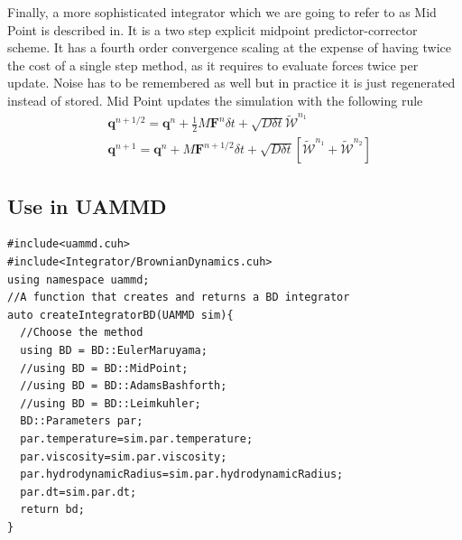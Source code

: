 \documentclass[ twoside,openright,titlepage,numbers=noenddot,%
headinclude,footinclude,cleardoublepage=empty,abstract=on,
BCOR=5mm,paper=a4,fontsize=11pt, dvipsnames
]{scrreprt}
\def\ucpp{uammd_cpp_lexer.py:UAMMDCppLexer -x}
\renewcommand{\vec}[1]{\bm{#1}}
\newcommand{\dt}{\delta t}
\newcommand{\half}{\frac{1}{2}}
\newcommand{\noise}{\widetilde{W}}
\newcommand{\ppos}{q}
\begin{document}
Finally, a more sophisticated integrator which we are going to refer to as Mid Point is described in\cite{Delong2013}. 
It is a two step explicit midpoint predictor-corrector scheme. It has a fourth order convergence scaling at the expense of having twice the cost of a single step method, as it requires to evaluate forces twice per update. Noise has to be remembered as well but in practice it is just regenerated instead of stored.
Mid Point updates the simulation with the following rule
\begin{equation}
  \begin{aligned}
    &\vec{\ppos}^{n+1/2} = \vec{\ppos}^n + \half M\vec{F}^n\dt + \sqrt{D\dt}\vec{\mathcal{\noise}}^{n_1}\\
    &\vec{\ppos}^{n+1} = \vec{\ppos}^n + M\vec{F}^{n+1/2}\dt + \sqrt{D\dt}\left[\vec{\mathcal{\noise}}^{n_1}  + \vec{\mathcal{\noise}}^{n_2}\right]
  \end{aligned}
\end{equation}
\subsection*{Use in UAMMD}

\begin{verbatim}
#include<uammd.cuh>
#include<Integrator/BrownianDynamics.cuh>
using namespace uammd;
//A function that creates and returns a BD integrator
auto createIntegratorBD(UAMMD sim){   
  //Choose the method
  using BD = BD::EulerMaruyama;
  //using BD = BD::MidPoint;
  //using BD = BD::AdamsBashforth;
  //using BD = BD::Leimkuhler;
  BD::Parameters par;
  par.temperature=sim.par.temperature;
  par.viscosity=sim.par.viscosity;
  par.hydrodynamicRadius=sim.par.hydrodynamicRadius;
  par.dt=sim.par.dt;
  return bd;
}
\end{verbatim}
\end{document}
